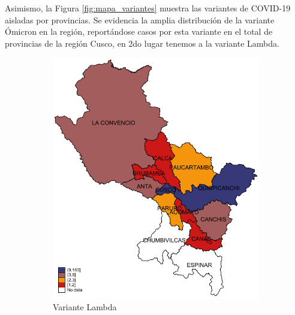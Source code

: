 \documentclass[12pt,a4paper,openany]{book}
\begin{document}
	Asimismo, la Figura \ref{fig:mapa_variantes} muestra las variantes de COVID-19 aisladas por provincias. Se evidencia la amplia distribución de la variante Ómicron en la región, reportándose casos por esta variante en el total de provincias de la región Cusco, en 2do lugar tenemos a la variante Lambda.
	
	\begin{figure}[h]
		\caption{Distribución provincial de las variantes de SARS-CoV-2 aisladas en la Región Cusco hasta la SE 43-2022.}
		\label{fig:mapa_variantes}
		\centering
		\begin{subfigure}[b]{0.40\textwidth}
			\centering
			\includegraphics[width=\textwidth]{../figuras/variantes_provincial_lambda.pdf}
			\caption{Variante Lambda}
		\end{subfigure}
		\hfill
		\begin{subfigure}[b]{0.40\textwidth}
			\centering

\end{subfigure}
\end{figure}
\end{document}
